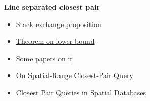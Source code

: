 \documentclass{article}
\begin{document}
{\textbf{Line separated closest pair}
\begin{itemize}
\item
\href{https://cs.stackexchange.com/questions/2415/shortest-distance-between-a-point-in-a-and-a-point-in-b}{Stack exchange proposition}
\item
\href{https://cstheory.stackexchange.com/questions/9824/find-shortest-pairwise-distance-of-points-in-on-log-n}{Theorem on lower-bound}
\item
\href{https://scholar.google.com/scholar?oi=bibs&hl=en&cluster=7853340637852591905}{Some papers on it}
\item
\href{http://www.zgking.com:8080/home/donghui/publications/closestpair.pdf}{On Spatial-Range Closest-Pair Query}
\item
\href{http://delab.csd.auth.gr/papers/SIGMOD00cmtv.pdf}{Closest Pair Queries in Spatial Databases}
\end{itemize}

}
\end{document}
